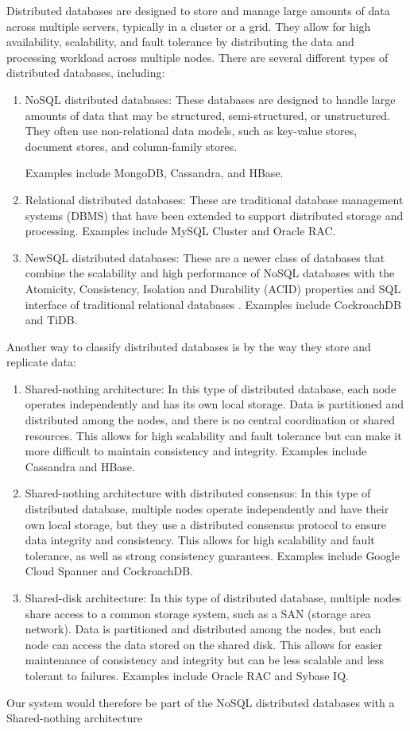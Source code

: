 \documentclass{article}
\begin{document}
Distributed databases are designed to store and manage large amounts of data across multiple servers, typically in a cluster or a grid. They allow for high availability, scalability, and fault tolerance by distributing the data and processing workload across multiple nodes.
There are several different types of distributed databases, including:
\begin{enumerate}
\item NoSQL distributed databases: These databases are designed to handle large amounts of data that may be structured, semi-structured, or unstructured. They often use non-relational data models, such as key-value stores, document stores, and column-family stores. 
\cite{ref2}

Examples include MongoDB, Cassandra, and HBase.
\item Relational distributed databases: These are traditional database management systems (DBMS) that have been extended to support distributed storage and processing. Examples include MySQL Cluster and Oracle RAC.
\item NewSQL distributed databases: These are a newer class of databases that combine the scalability and high performance of NoSQL databases with the Atomicity, Consistency, Isolation and Durability (ACID) properties and SQL interface of traditional relational databases . Examples include CockroachDB and TiDB. 
\cite{ref3}

\end{enumerate}
Another way to classify distributed databases is by the way they store and replicate data: 
\cite{ref4}

\begin{enumerate}
\item Shared-nothing architecture: In this type of distributed database, each node operates independently and has its own local storage. Data is partitioned and distributed among the nodes, and there is no central coordination or shared resources. This allows for high scalability and fault tolerance but can make it more difficult to maintain consistency and integrity. Examples include Cassandra and HBase.
\item Shared-nothing architecture with distributed consensus: In this type of distributed database, multiple nodes operate independently and have their own local storage, but they use a distributed consensus protocol to ensure data integrity and consistency. This allows for high scalability and fault tolerance, as well as strong consistency guarantees. Examples include Google Cloud Spanner and CockroachDB.
\item Shared-disk architecture: In this type of distributed database, multiple nodes share access to a common storage system, such as a SAN (storage area network). Data is partitioned and distributed among the nodes, but each node can access the data stored on the shared disk. This allows for easier maintenance of consistency and integrity but can be less scalable and less tolerant to failures. Examples include Oracle RAC and Sybase IQ.
\end{enumerate}
Our system would therefore be part of the NoSQL distributed databases with a Shared-nothing architecture
\end{document}
